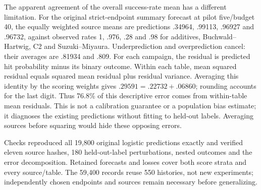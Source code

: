 The apparent agreement of the overall success-rate mean has a different limitation. For the original strict-endpoint summary forecast at pilot five/budget 40, the equally weighted source means are predictions .34964, .99113, .96927 and .96732, against observed rates 1, .976, .28 and .98 for additives, Buchwald--Hartwig, C2 and Suzuki--Miyaura. Underprediction and overprediction cancel: their averages are .81934 and .809. For each campaign, the residual is predicted hit probability minus its binary outcome. Within each table, mean squared residual equals squared mean residual plus residual variance. Averaging this identity by the scoring weights gives $.29591=.22732+.06860$; rounding accounts for the last digit. Thus 76.8\% of this descriptive error comes from within-table mean residuals. This is not a calibration guarantee or a population bias estimate; it diagnoses the existing predictions without fitting to held-out labels. Averaging sources before squaring would hide these opposing errors.

Checks reproduced all 19,800 original logistic predictions exactly and verified eleven source hashes, 180 held-out-label perturbations, nested outcomes and the error decomposition. Retained forecasts and losses cover both score strata and every source/table. The 59,400 records reuse 550 histories, not new experiments; independently chosen endpoints and sources remain necessary before generalizing.
